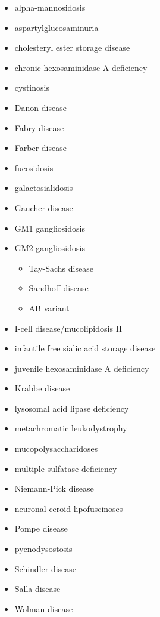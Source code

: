 \begin{itemize}
	\tightlist
	\item
	alpha-mannosidosis
	\item
	aspartylglucosaminuria
	\item
	cholesteryl ester storage disease
	\item
	chronic hexosaminidase A deficiency
	\item
	cystinosis
	\item
	Danon disease
	\item
	Fabry disease
	\item
	Farber disease
	\item
	fucosidosis
	\item
	galactosialidosis
	\item
	Gaucher disease
	\item
	GM1 gangliosidosis
	\item
	GM2 gangliosidosis
	
	\begin{itemize}
		\tightlist
		\item
		Tay-Sachs disease
		\item
		Sandhoff disease
		\item
		AB variant
	\end{itemize}
	\item
	I-cell disease/mucolipidosis II
	\item
	infantile free sialic acid storage disease
	\item
	juvenile hexosaminidase A deficiency
	\item
	Krabbe disease
	\item
	lysosomal acid lipase deficiency
	\item
	metachromatic leukodystrophy
	\item
	mucopolysaccharidoses
	\item
	multiple sulfatase deficiency
	\item
	Niemann-Pick disease
	\item
	neuronal ceroid lipofuscinoses
	\item
	Pompe disease
	\item
	pycnodysostosis
	\item
	Schindler disease
	\item
	Salla disease
	\item
	Wolman disease
\end{itemize}